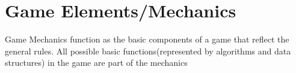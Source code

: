 \section{Game Elements/Mechanics}
Game Mechanics function as the basic components of a game that reflect the general rules. All possible basic functions(represented by algorithms and data structures) in the game are part of the mechanics